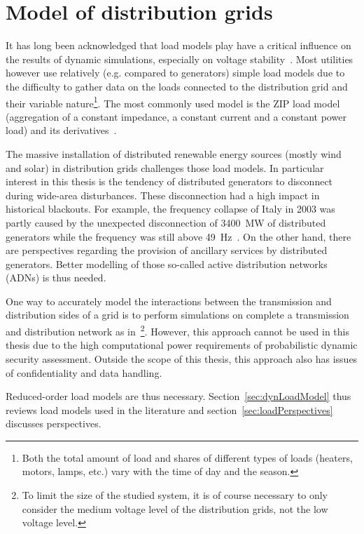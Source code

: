 \chapter{Model of distribution grids}
\label{ch:distrib}


It has long been acknowledged that load models play have a critical influence on the results of dynamic simulations, especially on voltage stability~\cite{kundur}. Most utilities however use relatively (e.g. compared to generators) simple load models due to the difficulty to gather data on the loads connected to the distribution grid and their variable nature\footnote{Both the total amount of load and shares of different types of loads (heaters, motors, lamps, etc.) vary with the time of day and the season.}. The most commonly used model is the ZIP load model (aggregation of a constant impedance, a constant current and a constant power load) and its derivatives~\cite{IndustryLoadModel}.

The massive installation of distributed renewable energy sources (mostly wind and solar) in distribution grids challenges those load models. In particular interest in this thesis is the tendency of distributed generators to disconnect during wide-area disturbances. These disconnection had a high impact in historical blackouts. For example, the frequency collapse of Italy in 2003 was partly caused by the unexpected disconnection of 3400~MW of distributed generators while the frequency was still above 49~Hz~\cite[p115]{Italy2003}. On the other hand, there are perspectives regarding the provision of ancillary services by distributed generators. Better modelling of those so-called active distribution networks (ADNs) is thus needed.

One way to accurately model the interactions between the transmission and distribution sides of a grid is to perform simulations on complete a transmission and distribution network as in~\cite{FullTDexample}\footnote{To limit the size of the studied system, it is of course necessary to only consider the medium voltage level of the distribution grids, not the low voltage level.}. However, this approach cannot be used in this thesis due to the high computational power requirements of probabilistic dynamic security assessment. Outside the scope of this thesis, this approach also has issues of confidentiality and data handling.


Reduced-order load models are thus necessary. Section~\ref{sec:dynLoadModel} thus reviews load models used in the literature%
and section~\ref{sec:loadPerspectives} discusses perspectives.

